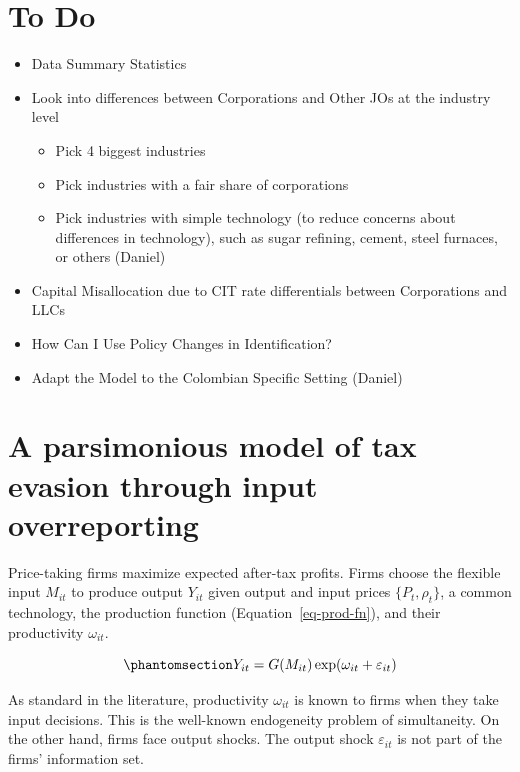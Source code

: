 \documentclass[
  12pt]{article}
\providecommand{\tightlist}{%
  \setlength{\itemsep}{0pt}\setlength{\parskip}{0pt}}\usepackage{longtable,booktabs,array}
\theoremstyle{definition}
\theoremstyle{remark}
\begin{document}
\section*{To Do}\label{to-do}

\begin{itemize}
\tightlist
\item
  Data Summary Statistics
\item
  Look into differences between Corporations and Other JOs at the
  industry level

  \begin{itemize}
  \tightlist
  \item
    Pick 4 biggest industries
  \item
    Pick industries with a fair share of corporations
  \item
    Pick industries with simple technology (to reduce concerns about
    differences in technology), such as sugar refining, cement, steel
    furnaces, or others (Daniel)
  \end{itemize}
\item
  Capital Misallocation due to CIT rate differentials between
  Corporations and LLCs
\item
  How Can I Use Policy Changes in Identification?
\item
  Adapt the Model to the Colombian Specific Setting (Daniel)
\end{itemize}

\section{A parsimonious model of tax evasion through input
overreporting}\label{a-parsimonious-model-of-tax-evasion-through-input-overreporting}

Price-taking firms maximize expected after-tax profits. Firms choose the
flexible input \(M_{it}\) to produce output \(Y_{it}\) given output and
input prices \(\{P_{t}, \rho_t\}\), a common technology, the production
function (Equation~\ref{eq-prod-fn}), and their productivity
\(\omega_{it}\).

\begin{equation}\phantomsection\label{eq-prod-fn}{
Y_{it}=G(M_{it})\exp(\omega_{it}+\varepsilon_{it})
}\end{equation}

As standard in the literature, productivity \(\omega_{it}\) is known to
firms when they take input decisions. This is the well-known endogeneity
problem of simultaneity. On the other hand, firms face output shocks.
The output shock \(\varepsilon_{it}\) is not part of the firms'
information set.
\end{document}
